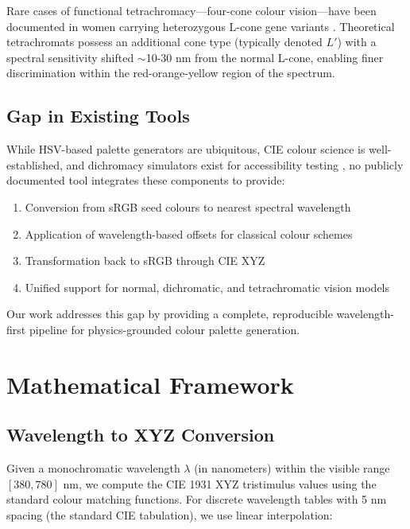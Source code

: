 \documentclass[12pt,a4paper]{article}
\newcommand{\wavelength}{\lambda}
\begin{document}
Rare cases of functional tetrachromacy—four-cone colour vision—have been documented in women carrying heterozygous L-cone gene variants \cite{jameson2001richer,jordan2010neural}. Theoretical tetrachromats possess an additional cone type (typically denoted $L'$) with a spectral sensitivity shifted $\sim$10-30 nm from the normal L-cone, enabling finer discrimination within the red-orange-yellow region of the spectrum.

\subsection{Gap in Existing Tools}

While HSV-based palette generators are ubiquitous, CIE colour science is well-established, and dichromacy simulators exist for accessibility testing \cite{wickline2000coblis,machado2009physiological}, no publicly documented tool integrates these components to provide:

\begin{enumerate}
\item Conversion from sRGB seed colours to nearest spectral wavelength
\item Application of wavelength-based offsets for classical colour schemes
\item Transformation back to sRGB through CIE XYZ
\item Unified support for normal, dichromatic, and tetrachromatic vision models
\end{enumerate}

Our work addresses this gap by providing a complete, reproducible wavelength-first pipeline for physics-grounded colour palette generation.

\section{Mathematical Framework}
\label{sec:framework}

\subsection{Wavelength to XYZ Conversion}

Given a monochromatic wavelength $\wavelength$ (in nanometers) within the visible range $[380, 780]$ nm, we compute the CIE 1931 XYZ tristimulus values using the standard colour matching functions. For discrete wavelength tables with 5 nm spacing (the standard CIE tabulation), we use linear interpolation:
\end{document}
